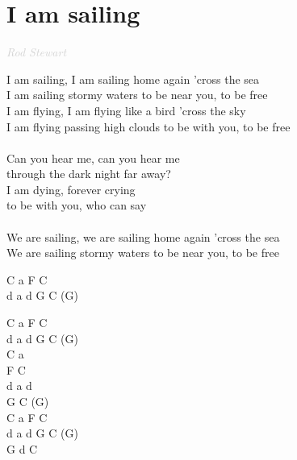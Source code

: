 \documentclass[a5paper, 10pt]{book}
\begin{document}
\section{I am sailing}\textcolor{lightgray}{\textit{Rod Stewart
}}\vspace*{2mm}\\
\begin{minipage}[t]{0.80\textwidth}
I am sailing, I am sailing home again 'cross the sea\\
I am sailing stormy waters to be near you, to be free\vspace*{2mm}
\\
I am flying, I am flying like a bird 'cross the sky\\
I am flying passing high clouds to be with you, to be free\\
\\
\hspace*{5mm}Can you hear me, can you hear me \\
\hspace*{5mm}through the dark night far away?\\
\hspace*{5mm}I am dying, forever crying \\
\hspace*{5mm}to be with you, who can say\\
\\
We are sailing, we are sailing home again 'cross the sea\\
We are sailing stormy waters to be near you, to be free\\
\end{minipage}
\begin{minipage}[t]{0.2\textwidth}
C a F C\\
d a d G C (G)\vspace*{2mm}

C a F C\\
d a d G C (G)\\

C a\\ F C\\
d a d\\ G C (G)\\

C a F C\\
d a d G C (G)\\
G d C\\
\end{minipage}

\newpage
\end{document}
